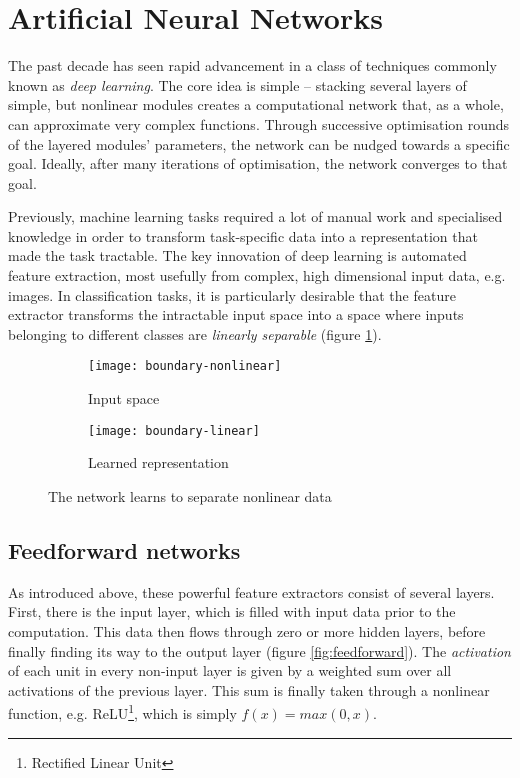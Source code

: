 \documentclass[../../report.tex]{subfiles}
\begin{document}
\section{Artificial Neural Networks}

The past decade has seen rapid advancement in a class of techniques commonly
known as \emph{deep learning}. The core idea is simple -- stacking several
layers of simple, but nonlinear modules creates a computational network that, as
a whole, can approximate very complex functions. Through successive optimisation
rounds of the layered modules' parameters, the network can be nudged towards a
specific goal. Ideally, after many iterations of optimisation, the network
converges to that goal.

Previously, machine learning tasks required a lot of manual work and specialised
knowledge in order to transform task-specific data into a representation that
made the task tractable. The key innovation of deep learning is automated
feature extraction, most usefully from complex, high dimensional input data,
e.g. images. In classification tasks, it is particularly desirable that the
feature extractor transforms the intractable input space into a space where
inputs belonging to different classes are \emph{linearly separable} (figure
\ref{fig:representation-learning}). \cite{LeCun2015}

\begin{figure}
  \centering
  \begin{subfigure}[b]{0.49\textwidth}
    \centering
    \texttt{[image: boundary-nonlinear]}
    \caption{Input space}
  \end{subfigure}
  \hfill
  \begin{subfigure}[b]{0.49\textwidth}
    \centering
    \texttt{[image: boundary-linear]}
    \caption{Learned representation}
  \end{subfigure}
  \caption{The network learns to separate nonlinear data \cite{Olah2014}}
  \label{fig:representation-learning}
\end{figure}

\subsection{Feedforward networks}

As introduced above, these powerful feature extractors consist of several
layers. First, there is the input layer, which is filled with input data prior
to the computation. This data then flows through zero or more hidden layers,
before finally finding its way to the output layer (figure
\ref{fig:feedforward}). The \emph{activation} of each unit in every non-input
layer is given by a weighted sum over all activations of the previous layer.
This sum is finally taken through a nonlinear function, e.g.
ReLU\footnote{Rectified Linear Unit}, which is simply \(f(x) = max(0, x)\).
\end{document}
